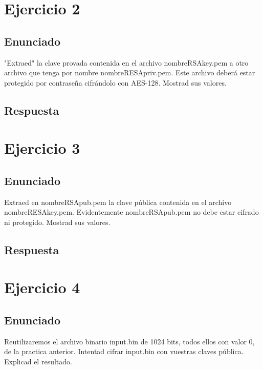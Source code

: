 \documentclass[10pt,a4paper,spanish]{report}
\begin{document}
\chapter{Ejercicio 2}

\section{Enunciado}
\noindent
"Extraed" la clave provada contenida en el archivo nombreRSAkey.pem a otro archivo que tenga por nombre nombreRESApriv.pem. Este archivo deberá estar protegido por contraseña cifrándolo con AES-128. Mostrad sus valores.

\section{Respuesta}
\noindent

\chapter{Ejercicio 3}

\section{Enunciado}
\noindent
Extraed en nombreRSApub.pem la clave pública contenida en el archivo nombreRESAkey.pem. Evidentemente nombreRSApub.pem no debe estar cifrado ni protegido. Mostrad sus valores.

\section{Respuesta}
\noindent

\chapter{Ejercicio 4}

\section{Enunciado}
\noindent
Reutilizaremos el archivo binario input.bin de 1024 bits, todos ellos con valor 0, de la practica anterior. Intentad cifrar input.bin con vuestras claves pública. Explicad el resultado.
\end{document}
